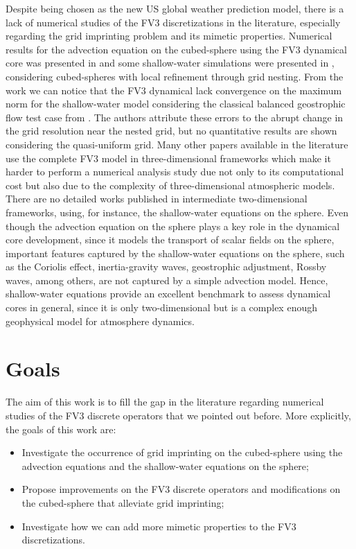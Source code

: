 Despite being chosen as the new US global weather prediction model,
there is a lack of numerical studies of the FV3 discretizations in the literature,
especially regarding the grid imprinting problem and its mimetic properties.
Numerical results for the advection equation on the cubed-sphere using the
FV3 dynamical core was presented in \citet{putman:2007} and some shallow-water 
simulations were presented in \citet{harris:2013}, considering cubed-spheres
with local refinement through grid nesting.
From the work \citet{harris:2013} we can notice that the FV3 dynamical
lack convergence on the maximum norm for the shallow-water model considering
the classical balanced geostrophic flow test case from \cite{will:1992}.
The authors attribute these errors to the abrupt change in the grid resolution
near the nested grid, but no quantitative results are shown considering the quasi-uniform grid.
Many other papers available in the literature use the complete FV3 model in three-dimensional
frameworks which make it harder to perform a numerical analysis study due not only to its computational cost
but also due to the complexity of three-dimensional atmospheric models.
There are no detailed works published in intermediate two-dimensional frameworks, using, for 
instance, the shallow-water equations on the sphere.
Even though the advection equation on the sphere plays a key role in the dynamical core development,
since it models the transport of scalar fields on the sphere, important features captured by the shallow-water
equations on the sphere, such as the Coriolis effect, inertia-gravity waves, geostrophic adjustment, Rossby waves,
among others, are not captured by a simple advection model.
Hence, shallow-water equations provide an excellent benchmark to assess dynamical cores in general,
since it is only two-dimensional but is a complex enough geophysical model for atmosphere dynamics.
\section{Goals}
The aim of this work is to fill the gap in the literature regarding numerical studies of the FV3 
discrete operators that we pointed out before.
More explicitly, the goals of this work are:
\begin{itemize}
  \item Investigate the occurrence of grid imprinting on the cubed-sphere using the advection equations and
    the shallow-water equations on the sphere;
  \item Propose improvements on the FV3 discrete operators and modifications on the cubed-sphere that alleviate
    grid imprinting;
  \item Investigate how we can add more mimetic properties to the FV3 discretizations.
\end{itemize}

